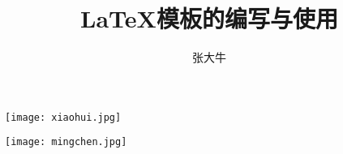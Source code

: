
\title{LaTeX模板的编写与使用} %
\author{张大牛} %


\begin{flushleft}
\hspace{8.5mm}\texttt{[image: xiaohui.jpg]} %
\end{flushleft}
\begin{center} %
\texttt{[image: mingchen.jpg]} %
\end{center}
\vspace{6.5mm}
\begin{center}
{\heiti \bfseries {}}
\end{center}
\vspace{20mm}
\begin{center}
\makeatletter
{\heiti \erhao {\textbf{\@title}}}
\makeatother
\end{center}
\vspace{28mm}
\begin{center}
\makeatletter
{\sanhao {}}\\\vspace{2.4mm}
{\sanhao {}}\\\vspace{2.4mm}
{\sanhao {}}\\\vspace{2.4mm}
{\sanhao {}}\\\vspace{2.4mm}
{\sanhao {}}\\\vspace{2.4mm}
{\sanhao {}}\\\vspace{2.4mm}
{\sanhao {}}
\makeatother
\end{center}
\vfill
\begin{center}
\makeatletter
\sanhao \heiti {\CJK@today}
\makeatother
\end{center}

